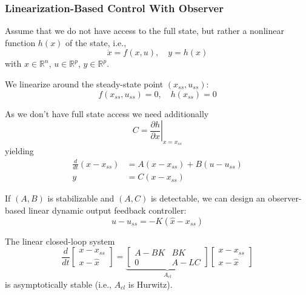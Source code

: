 \subsubsection{Linearization-Based Control With Observer}

Assume that we do not have access to the full state, but rather a nonlinear function $h(x)$ of the state, i.e.,
\begin{equation*}
    \dot{x} = f(x, u), \quad y = h(x)
\end{equation*}
with $x \in \mathbb{R}^{n}$, $u \in \mathbb{R}^{p}$, $y \in \mathbb{R}^{p}$.

\newpar{}

We linearize around the steady-state point $(x_{ss}, u_{ss})$:
\begin{equation*}
    f(x_{ss}, u_{ss}) = 0, \quad h(x_{ss}) = 0
\end{equation*}

\newpar{}

As we don't have full state access we need additionally
\begin{equation*}
    C = \left. \frac{\partial h}{\partial x} \right|_{x=x_{ss}}
\end{equation*}
yielding
\begin{align*}
    \frac{d}{dt} (x - x_{ss}) & = A (x - x_{ss}) + B (u - u_{ss}) \\
    y                         & = C (x - x_{ss})
\end{align*}

\newpar{}

If $(A, B)$ is stabilizable and $(A, C)$ is detectable, we can design an observer-based linear dynamic output feedback controller:
\begin{equation*}
    u - u_{ss} = -K(\hat{x} - x_{ss})
\end{equation*}

\newpar{}

The linear closed-loop system
\begin{equation*}
    \frac{d}{dt} \begin{bmatrix} x - x_{ss} \\ x - \hat{x} \end{bmatrix} = \underbrace{\begin{bmatrix} A - BK & BK \\ 0 & A - LC \end{bmatrix}}_{A_{cl}} \begin{bmatrix} x - x_{ss} \\ x - \hat{x} \end{bmatrix}
\end{equation*}
is asymptotically stable (i.e., $A_{cl}$ is Hurwitz).

